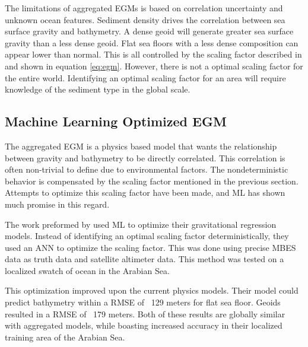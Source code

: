\par
The limitations of aggregated \ac{EGM}s is based on correlation uncertainty and unknown ocean features.
Sediment density drives the correlation between sea surface gravity and bathymetry.
A dense geoid will generate greater sea surface gravity than a less dense geoid.
Flat sea floors with a less dense composition can appear lower than normal.
This is all controlled by the scaling factor described in \cite{smith1994bathymetric} and shown in equation \ref{eq:egm}. 
However, there is not a optimal scaling factor for the entire world.
Identifying an optimal scaling factor for an area will require knowledge of the sediment type in the global scale.


\subsection{Machine Learning Optimized \ac{EGM}}
The aggregated \ac{EGM} is a physics based model that wants the relationship between gravity and bathymetry to be directly correlated.
This correlation is often non-trivial to define due to environmental factors.
The nondeterministic behavior is compensated by the scaling factor mentioned in the previous section.
Attempts to optimize this scaling factor have been made, and \ac{ML} has shown much promise in this regard.

\par
The work preformed by \cite{jena2012prediction} used \ac{ML} to optimize their gravitational regression models.
Instead of identifying an optimal scaling factor deterministically, they used an \ac{ANN} to optimize the scaling factor.
This was done using precise \ac{MBES} data as truth data and satellite altimeter data.
This method was tested on a localized swatch of ocean in the Arabian Sea.

\par
This optimization improved upon the current physics models.
Their model could predict bathymetry within a \ac{RMSE} of ~129 meters for flat sea floor.
Geoids resulted in a \ac{RMSE} of ~179 meters.
Both of these results are globally similar with aggregated models, while boasting increased accuracy in their localized training area of the Arabian Sea.

